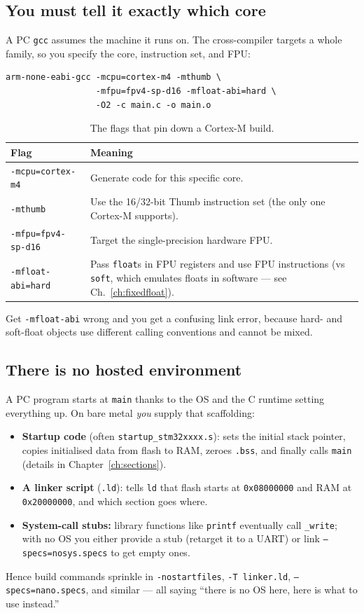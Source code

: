 \documentclass[11pt,a4paper,oneside]{book}
\newcommand{\code}[1]{\texttt{#1}}
\begin{document}
\subsection{You must tell it exactly which core}
A PC \code{gcc} assumes the machine it runs on. The cross-compiler targets a
whole family, so you specify the core, instruction set, and FPU:
\begin{lstlisting}[style=shell]
arm-none-eabi-gcc -mcpu=cortex-m4 -mthumb \
                  -mfpu=fpv4-sp-d16 -mfloat-abi=hard \
                  -O2 -c main.c -o main.o
\end{lstlisting}
\begin{table}[h]
\centering
\caption{The flags that pin down a Cortex-M build.}
\small
\begin{tabular}{@{}lp{9.2cm}@{}}
\toprule
\textbf{Flag} & \textbf{Meaning}\\
\midrule
\code{-mcpu=cortex-m4} & Generate code for this specific core.\\
\code{-mthumb}         & Use the 16/32-bit Thumb instruction set (the only one Cortex-M supports).\\
\code{-mfpu=fpv4-sp-d16} & Target the single-precision hardware FPU.\\
\code{-mfloat-abi=hard}  & Pass \code{float}s in FPU registers and use FPU instructions (vs \code{soft}, which emulates floats in software --- see Ch.~\ref{ch:fixedfloat}).\\
\bottomrule
\end{tabular}
\end{table}
Get \code{-mfloat-abi} wrong and you get a confusing link error, because hard-
and soft-float objects use different calling conventions and cannot be mixed.

\subsection{There is no hosted environment}
A PC program starts at \code{main} thanks to the OS and the C runtime setting
everything up. On bare metal \emph{you} supply that scaffolding:
\begin{itemize}[leftmargin=1.4cm]
  \item \textbf{Startup code} (often \code{startup\_stm32xxxx.s}): sets the
        initial stack pointer, copies initialised data from flash to RAM, zeroes
        \code{.bss}, and finally calls \code{main}
        (details in Chapter~\ref{ch:sections}).
  \item \textbf{A linker script} (\code{.ld}): tells \code{ld} that flash starts
        at \code{0x08000000} and RAM at \code{0x20000000}, and which section
        goes where.
  \item \textbf{System-call stubs:} library functions like \code{printf}
        eventually call \code{\_write}; with no OS you either provide a stub
        (retarget it to a UART) or link \code{--specs=nosys.specs} to get empty
        ones.
\end{itemize}
Hence build commands sprinkle in \code{-nostartfiles}, \code{-T linker.ld},
\code{--specs=nano.specs}, and similar --- all saying ``there is no OS here,
here is what to use instead.''
\end{document}
